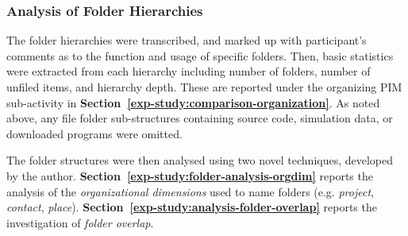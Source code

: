 \subsubsection{Analysis of Folder Hierarchies}

The folder hierarchies were transcribed, and marked up with participant's comments as to the function and usage of specific folders. %
Then, basic statistics were extracted from each hierarchy including number of folders, number of unfiled items, and hierarchy depth. These are reported under the organizing PIM sub-activity in \textbf{Section~\ref{exp-study:comparison-organization}}.  As noted above, any file folder sub-structures containing source code, simulation data, or downloaded programs were omitted.

The folder structures were then analysed using two novel techniques, developed by the author.
\textbf{Section~\ref{exp-study:folder-analysis-orgdim}} reports the analysis of the \textit{organizational dimensions} used to name folders (e.g. \textit{project}, \textit{contact}, \textit{place}). 
\textbf{Section~\ref{exp-study:analysis-folder-overlap}} reports the investigation of \textit{folder overlap}.



